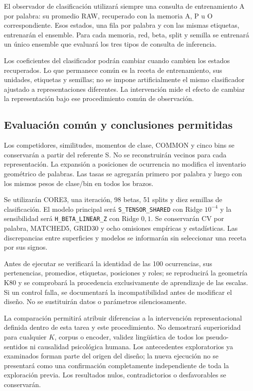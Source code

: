 El observador de clasificación utilizará siempre una consulta de entrenamiento A por palabra: su promedio RAW, recuperado con la memoria A, P u O correspondiente. Esos estados, una fila por palabra y con las mismas etiquetas, entrenarán el ensemble. Para cada memoria, red, beta, split y semilla se entrenará un único ensemble que evaluará los tres tipos de consulta de inferencia.

Los coeficientes del clasificador podrán cambiar cuando cambien los estados recuperados. Lo que permanece común es la receta de entrenamiento, sus unidades, etiquetas y semillas; no se impone artificialmente el mismo clasificador ajustado a representaciones diferentes. La intervención mide el efecto de cambiar la representación bajo ese procedimiento común de observación.

\subsection{Evaluación común y conclusiones permitidas}

Los competidores, similitudes, momentos de clase, COMMON y cinco bins se conservarán a partir del referente S. No se reconstruirán vecinos para cada representación. La expansión a posiciones de ocurrencia no modifica el inventario geométrico de palabras. Las tasas se agregarán primero por palabra y luego con los mismos pesos de clase/bin en todos los brazos.

Se utilizarán CORE3, una iteración, 98 betas, 51 splits y diez semillas de clasificación. El modelo principal será \texttt{S\_TENSOR\_SHARED} con Ridge $10^{-4}$ y la sensibilidad será \texttt{H\_BETA\_LINEAR\_Z} con Ridge $0{,}1$. Se conservarán CV por palabra, MATCHED5, GRID30 y ocho omisiones empíricas y estadísticas. Las discrepancias entre superficies y modelos se informarán sin seleccionar una receta por sus signos.

Antes de ejecutar se verificará la identidad de las 100 ocurrencias, sus pertenencias, promedios, etiquetas, posiciones y roles; se reproducirá la geometría K80 y se comprobará la procedencia exclusivamente de aprendizaje de las escalas. Si un control falla, se documentará la incompatibilidad antes de modificar el diseño. No se sustituirán datos o parámetros silenciosamente.

La comparación permitirá atribuir diferencias a la intervención representacional definida dentro de esta tarea y este procedimiento. No demostrará superioridad para cualquier $K$, corpus o encoder, validez lingüística de todos los pseudo-sentidos ni causalidad psicológica humana. Los antecedentes exploratorios ya examinados forman parte del origen del diseño; la nueva ejecución no se presentará como una confirmación completamente independiente de toda la exploración previa. Los resultados nulos, contradictorios o desfavorables se conservarán.

